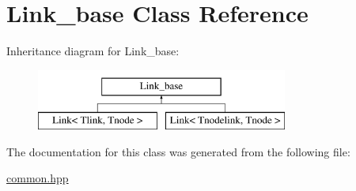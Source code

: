 \hypertarget{classLink__base}{\section{Link\-\_\-base Class Reference}
\label{classLink__base}
}
Inheritance diagram for Link\-\_\-base\-:\begin{figure}[H]
\begin{center}
\leavevmode
\includegraphics[height=2.000000cm]{classLink__base}
\end{center}
\end{figure}


The documentation for this class was generated from the following file\-:\begin{DoxyCompactItemize}
\item 
\hyperlink{common_8hpp}{common.\-hpp}\end{DoxyCompactItemize}
